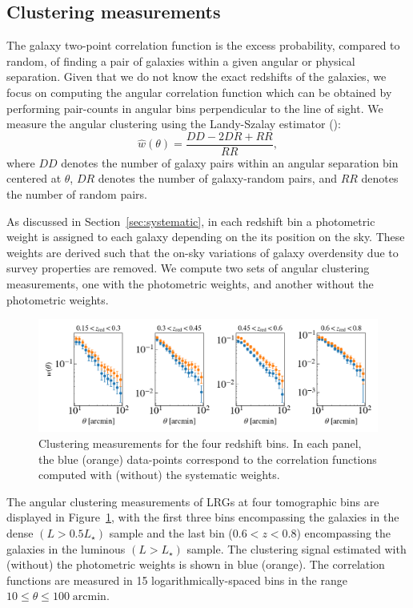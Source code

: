 \documentclass{aa}
\numberwithin{equation}{section}
\begin{document}
{\subsection{Clustering measurements}\label{sec:measurement}

The galaxy two-point correlation function is the excess probability, compared to random, of finding a pair of galaxies within a given angular or physical separation. Given that we do not know the exact redshifts of the galaxies, we focus on computing the angular correlation function which can be obtained by performing pair-counts in angular bins perpendicular to the line of sight. We measure the angular clustering using the Landy-Szalay estimator (\citealt{landy}):
\begin{equation}
    \widehat{w}(\theta) = \frac{DD-2DR+RR}{RR},
\label{eq:landy}
\end{equation}
where $DD$ denotes the number of galaxy pairs within an angular separation bin centered at $\theta$, $DR$ denotes the number of galaxy-random pairs, and $RR$ denotes the number of random pairs. 

As discussed in Section~\ref{sec:systematic}, in each redshift bin a photometric weight is assigned to each galaxy depending on the its position on the sky. These weights are derived such that the on-sky variations of galaxy overdensity due to survey properties are removed. We compute two sets of angular clustering measurements, one with the photometric weights, and another without the photometric weights. 

\begin{figure}
\includegraphics[width=\textwidth]{figures_tmp/woftheta.png}
\caption{Clustering measurements for the four redshift bins. In each panel, the blue (orange) data-points correspond to the correlation functions computed with (without) the systematic weights.} 
\label{fig:xi} 
\end{figure}

The angular clustering measurements of LRGs at four tomographic bins are displayed in Figure~\ref{fig:xi}, with the first three bins encompassing the galaxies in the dense $(L> 0.5L_{\star})$ sample and the last bin ($0.6<z<0.8$) encompassing the galaxies in the luminous $(L> L_{\star})$ sample. The clustering signal estimated with (without) the photometric weights is shown in blue (orange). The correlation functions are measured in 15 logarithmically-spaced bins in the range $ 10\leq \theta \leq 100 \; \mathrm{arcmin}$. 

}
\end{document}
